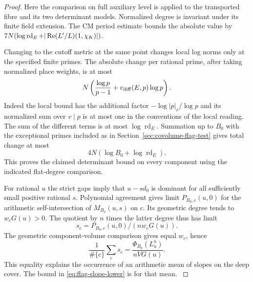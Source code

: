 \begin{proof}
Here the comparison on full auxiliary level is applied to the
transported fibre and its two determinant models. Normalized
degree is invariant under its finite field extension. The CM
period estimate bounds the absolute value by
\(7N(\log\operatorname{rd}_E+|\operatorname{Re} (L'/L)(1,\chi_K)|)\).
\label{cor:covolume-wall-shape-6}

Changing to the cutoff metric at the same point changes local
log norms only at the specified finite primes. The absolute
change per rational prime, after taking normalized place
weights, is at most
\[
 N\left(\frac{\log p}{p-1}+v_{\rm diff}(E,p)\log p\right).
\]
Indeed the local bound has the additional factor
\(-\log|p|_v/\log p\) and its normalized sum over \(v\mid p\)
is at most one in the conventions of the local reading.
The sum of the different terms is at most
\(\log\operatorname{rd}_E\). Summation up to \(B_0\)
with the exceptional primes included as in
Section~\ref{sec:covolume-flag-test} gives total change at most
\[
 4N(\log B_0+\log\operatorname{rd}_E).
\]
This proves the
claimed determinant bound on every component using the indicated
flat-degree comparison. \label{cor:covolume-wall-shape-7}

For rational \(u\) the strict gaps imply that \(u-sd_0\)
is dominant for all sufficiently small positive rational
\(s\). Polynomial agreement gives limit \(P_{B_0,c}(u,0)\)
for the arithmetic self-intersection of \(M_{B_0}(u,s)\)
on \(c\). Its geometric degree tends to \(w_cG(u)>0\).
The quotient by \(n\) times the latter degree thus has
limit
\[
 s_c=P_{B_0,c}(u,0)/(nw_cG(u)).
\]
The geometric
component-volume comparison gives equal \(w_c\), hence
\[
   \frac{1}{\#\{c\}}\sum_c s_c=\frac{\Phi_{B_0}(L_u^n)}{nVG(u)} .
\]
This equality explains the occurrence of an arithmetic mean of
slopes on the deep cover. The bound in \eqref{eq:flag-slope-lower}
is for that mean. \label{cor:covolume-wall-shape-8}
\end{proof}
